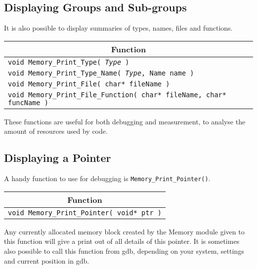 \documentclass[a4paper,12pt]{article}
\begin{document}
\subsection{Displaying Groups and Sub-groups}
It is also possible to display summaries of types, names, files and functions.

\begin{table}[h]
  \begin{tabular}{|p{13.3cm}|}
    \hline \multicolumn{1}{|c|}{\textbf{Function}} \\ \hline
    \texttt{void Memory\_Print\_Type( \textit{Type} )} \\ \hline
    \texttt{void Memory\_Print\_Type\_Name( \textit{Type}, Name name )} \\ \hline
    \texttt{void Memory\_Print\_File( char* fileName )} \\ \hline
    \texttt{void Memory\_Print\_File\_Function( char* fileName, char* funcName )} \\ \hline
  \end{tabular}
\end{table}

These functions are useful for both debugging and measurement, to analyse the amount of resources used by code.

\subsection{Displaying a Pointer}
A handy function to use for debugging is \texttt{Memory\_Print\_Pointer()}.

\begin{table}[h]
  \begin{tabular}{|p{13.3cm}|}
    \hline \multicolumn{1}{|c|}{\textbf{Function}} \\ \hline
    \texttt{void Memory\_Print\_Pointer( void* ptr )} \\ \hline
  \end{tabular}
\end{table}

Any currently allocated memory block created by the Memory module given to this function will give a print out of all details of this pointer. It is sometimes also possible to call this function from gdb, depending on your system, settings and current position in gdb.
\end{document}
